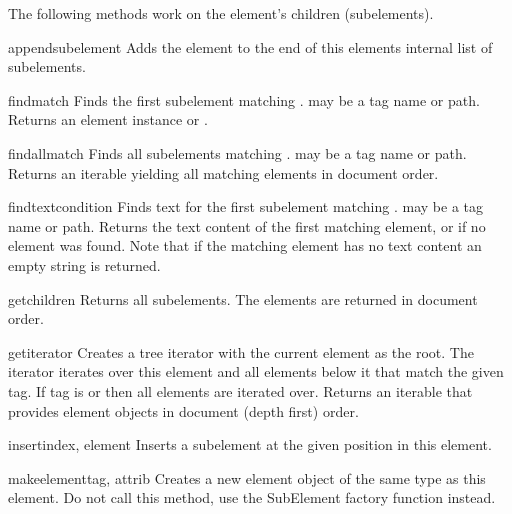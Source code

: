 The following methods work on the element's children (subelements).

\begin{methoddesc}[Element]{append}{subelement}
Adds the element  to the end of this elements internal list
of subelements.
\end{methoddesc}

\begin{methoddesc}[Element]{find}{match}
Finds the first subelement matching . 
 may be a tag name or path.
Returns an element instance or .
\end{methoddesc}

\begin{methoddesc}[Element]{findall}{match}
Finds all subelements matching . 
 may be a tag name or path.
Returns an iterable yielding all matching elements in document order.
\end{methoddesc}

\begin{methoddesc}[Element]{findtext}{condition}
Finds text for the first subelement matching . 
 may be a tag name or path.
Returns the text content of the first matching element, or
 if no element was found.  Note that if the
matching element has no text content an empty string is returned.
\end{methoddesc}

\begin{methoddesc}[Element]{getchildren}{}
Returns all subelements.  The elements are returned in document order.
\end{methoddesc}

\begin{methoddesc}[Element]{getiterator}{}
Creates a tree iterator with the current element as the root.  
The iterator iterates over this element and all elements below it 
that match the given tag. If tag
is  or  then all elements are iterated over.
Returns an iterable that provides element objects in document (depth first)
order.
\end{methoddesc}

\begin{methoddesc}[Element]{insert}{index, element}
Inserts a subelement at the given position in this element.
\end{methoddesc}

\begin{methoddesc}[Element]{makeelement}{tag, attrib}
Creates a new element object of the same type as this element.
Do not call this method, use the SubElement factory function instead.
\end{methoddesc}

